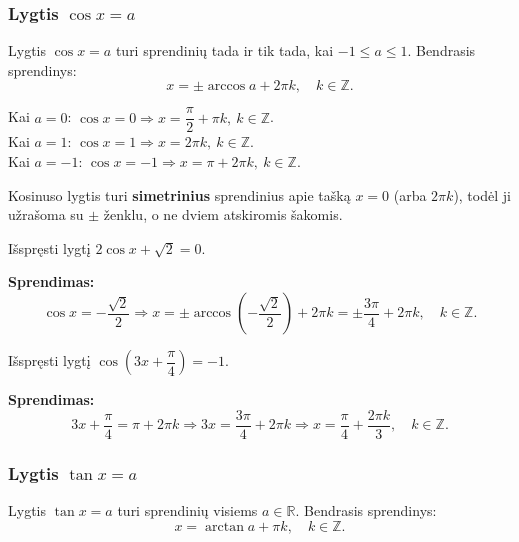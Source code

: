 \subsubsection{Lygtis \(\cos x = a\)}

\begin{definition}
Lygtis \(\cos x = a\) turi sprendinių tada ir tik tada, kai \(-1 \leq a \leq 1\). Bendrasis sprendinys:
\[
x = \pm\arccos a + 2\pi k, \quad k \in \mathbb{Z}.
\]
\end{definition}

\begin{remark}
Kai \(a = 0\): \(\cos x = 0 \Rightarrow x = \dfrac{\pi}{2} + \pi k,\ k \in \mathbb{Z}\).\\
Kai \(a = 1\): \(\cos x = 1 \Rightarrow x = 2\pi k,\ k \in \mathbb{Z}\).\\
Kai \(a = -1\): \(\cos x = -1 \Rightarrow x = \pi + 2\pi k,\ k \in \mathbb{Z}\).
\end{remark}

\begin{tcolorbox}[title={Svarbus skirtumas nuo sinuso lygties}]
Kosinuso lygtis turi \textbf{simetrinius} sprendinius apie tašką \(x = 0\) (arba \(2\pi k\)), todėl ji užrašoma su \(\pm\) ženklu, o ne dviem atskiromis šakomis.
\end{tcolorbox}

\begin{example}
Išspręsti lygtį \(2\cos x + \sqrt{2} = 0\).

\textbf{Sprendimas:}
\[
\cos x = -\frac{\sqrt{2}}{2} \Rightarrow x = \pm\arccos\!\left(-\frac{\sqrt{2}}{2}\right) + 2\pi k = \pm\frac{3\pi}{4} + 2\pi k,\quad k \in \mathbb{Z}.
\]
\end{example}

\begin{example}
Išspręsti lygtį \(\cos\!\left(3x + \dfrac{\pi}{4}\right) = -1\).

\textbf{Sprendimas:}
\[
3x + \frac{\pi}{4} = \pi + 2\pi k \Rightarrow 3x = \frac{3\pi}{4} + 2\pi k \Rightarrow x = \frac{\pi}{4} + \frac{2\pi k}{3},\quad k \in \mathbb{Z}.
\]
\end{example}

\subsubsection{Lygtis \(\tan x = a\)}

\begin{definition}
Lygtis \(\tan x = a\) turi sprendinių visiems \(a \in \mathbb{R}\). Bendrasis sprendinys:
\[
x = \arctan a + \pi k, \quad k \in \mathbb{Z}.
\]
\end{definition}

